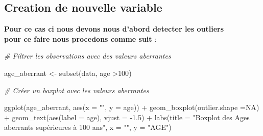 \documentclass[
  14pt,
]{article}
\newenvironment{Shaded}{\begin{snugshade}}{\end{snugshade}}
\newcommand{\AttributeTok}[1]{\textcolor[rgb]{0.77,0.63,0.00}{#1}}
\newcommand{\CommentTok}[1]{\textcolor[rgb]{0.56,0.35,0.01}{\textit{#1}}}
\newcommand{\ConstantTok}[1]{\textcolor[rgb]{0.00,0.00,0.00}{#1}}
\newcommand{\DecValTok}[1]{\textcolor[rgb]{0.00,0.00,0.81}{#1}}
\newcommand{\FloatTok}[1]{\textcolor[rgb]{0.00,0.00,0.81}{#1}}
\newcommand{\FunctionTok}[1]{\textcolor[rgb]{0.00,0.00,0.00}{#1}}
\newcommand{\NormalTok}[1]{#1}
\newcommand{\OtherTok}[1]{\textcolor[rgb]{0.56,0.35,0.01}{#1}}
\newcommand{\SpecialCharTok}[1]{\textcolor[rgb]{0.00,0.00,0.00}{#1}}
\newcommand{\StringTok}[1]{\textcolor[rgb]{0.31,0.60,0.02}{#1}}
\begin{document}
\begin{Shaded}
\end{Shaded}

\hypertarget{creation-de-nouvelle-variable}{%
\subsection{\texorpdfstring{\textbf{Creation de nouvelle variable}\\
}{Creation de nouvelle variable }}\label{creation-de-nouvelle-variable}}

\textbf{Pour ce cas ci nous devons nous d'abord detecter les outliers}\\

\textbf{pour ce faire nous procedons comme suit} :\\

\begin{Shaded}
\begin{Highlighting}[]
\CommentTok{\# Filtrer les observations avec des valeurs aberrantes}

\NormalTok{age\_aberrant }\OtherTok{\textless{}{-}} \FunctionTok{subset}\NormalTok{(data, }
\NormalTok{                       age }\SpecialCharTok{\textgreater{}}\DecValTok{100}\NormalTok{)}

\CommentTok{\# Créer un boxplot avec les valeurs aberrantes}

\FunctionTok{ggplot}\NormalTok{(age\_aberrant, }\FunctionTok{aes}\NormalTok{(}\AttributeTok{x =} \StringTok{""}\NormalTok{, }
                         \AttributeTok{y =}\NormalTok{ age)) }\SpecialCharTok{+}
  \FunctionTok{geom\_boxplot}\NormalTok{(}\AttributeTok{outlier.shape =}\ConstantTok{NA}\NormalTok{) }\SpecialCharTok{+}  
  \FunctionTok{geom\_text}\NormalTok{(}\FunctionTok{aes}\NormalTok{(}\AttributeTok{label =}\NormalTok{ age), }
            \AttributeTok{vjust =} \SpecialCharTok{{-}}\FloatTok{1.5}\NormalTok{) }\SpecialCharTok{+} 
  \FunctionTok{labs}\NormalTok{(}\AttributeTok{title =} \StringTok{"Boxplot des Ages aberrants supérieures à 100 ans"}\NormalTok{,}
       \AttributeTok{x =} \StringTok{""}\NormalTok{,}
       \AttributeTok{y =} \StringTok{"AGE"}\NormalTok{)}
\end{Highlighting}
\end{Shaded}
\end{document}
